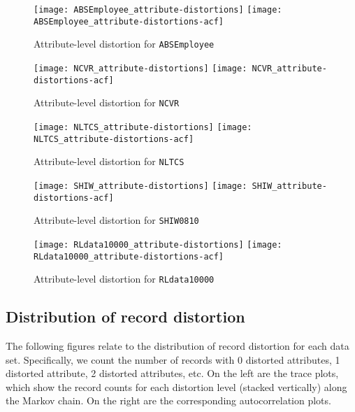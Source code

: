 \documentclass[12pt,letterpaper]{article}
\newcommand{\1}[1]{\mathbb{I}\!\left[#1\right]} %
\begin{document}
\begin{figure}[H]
  \texttt{[image: ABSEmployee\_attribute-distortions]} \hfill
  \texttt{[image: ABSEmployee\_attribute-distortions-acf]}
  \caption{Attribute-level distortion for \texttt{ABSEmployee}}
\end{figure}
\begin{figure}[H]
  \texttt{[image: NCVR\_attribute-distortions]} \hfill
  \texttt{[image: NCVR\_attribute-distortions-acf]}
  \caption{Attribute-level distortion for \texttt{NCVR}}
\end{figure}
\begin{figure}[H]
  \texttt{[image: NLTCS\_attribute-distortions]} \hfill
  \texttt{[image: NLTCS\_attribute-distortions-acf]}
  \caption{Attribute-level distortion for \texttt{NLTCS}}
\end{figure}
\begin{figure}[H]
  \texttt{[image: SHIW\_attribute-distortions]} \hfill
  \texttt{[image: SHIW\_attribute-distortions-acf]}
  \caption{Attribute-level distortion for \texttt{SHIW0810}}
\end{figure}
\begin{figure}[H]
  \texttt{[image: RLdata10000\_attribute-distortions]} \hfill
  \texttt{[image: RLdata10000\_attribute-distortions-acf]}
  \caption{Attribute-level distortion for \texttt{RLdata10000}}
\end{figure}

\subsection{Distribution of record distortion}
The following figures relate to the distribution of record distortion 
for each data set.
Specifically, we count the number of records with 0 distorted attributes, 
1 distorted attribute, 2 distorted attributes, etc.
On the left are the trace plots, which show the record counts for each 
distortion level (stacked vertically) along the Markov chain.
On the right are the corresponding autocorrelation plots.
\end{document}
